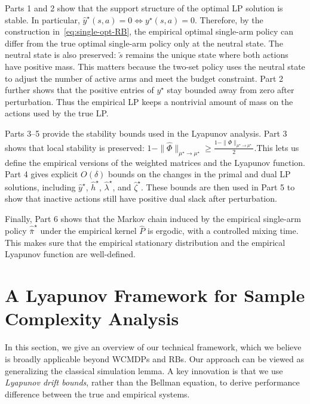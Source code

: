 \documentclass[mnsc,nonblindrev]{informs3}
\begin{document}
Parts 1 and 2 show that the support structure of the optimal LP solution is stable. In particular, \(\widehat y^\star(s,a)=0 \Longleftrightarrow y^\star(s,a)=0. \) Therefore, by the construction in~\eqref{eq:single-opt-RB}, the empirical optimal single-arm policy can differ from the true optimal single-arm policy only at the neutral state. The neutral state is also preserved: \(\tilde s\) remains the unique state where both actions have positive mass. This matters because the two-set policy uses the neutral state to adjust the number of active arms and meet the budget constraint. Part 2 further shows that the positive entries of \(y^\star\) stay bounded away from zero after perturbation. Thus the empirical LP keeps a nontrivial amount of mass on the actions used by the true LP.


Parts 3--5 provide the stability bounds used in the Lyapunov analysis. Part 3 shows that local stability is preserved: \( 1-\|\widehat\Phi\|_{\mu^\star\to\mu^\star} \ge \frac{1-\|\Phi\|_{\mu^\star\to\mu^\star}}{2}. \)This lets us define the empirical versions of the weighted matrices and the Lyapunov function. Part 4 gives explicit \(O(\delta)\) bounds on the changes in the primal and dual LP solutions, including \(\widehat y^\star\), \(\widehat h^\star\), \(\widehat\lambda^\star\), and \(\widehat\zeta^\star\). These bounds are then used in Part 5 to show that inactive actions still have positive dual slack after perturbation.

Finally, Part 6  shows that the Markov chain induced by the empirical
single-arm policy \(\widehat{\bar\pi}^\star\) under the empirical kernel
\(\widehat P\) is ergodic, with a controlled mixing time. This makes sure that the empirical stationary distribution and the empirical
Lyapunov function are well-defined.



\section{A Lyapunov Framework for Sample Complexity Analysis}\label{sec:Lyapunov-Framework}


In this section, we give an overview of our technical framework, which we believe is broadly applicable beyond WCMDPs and RBs.
Our approach can be viewed as generalizing the classical simulation lemma.
A key innovation is that we use \emph{Lyapunov drift bounds}, rather than the Bellman equation, to derive performance difference between the true and empirical systems.
\end{document}
